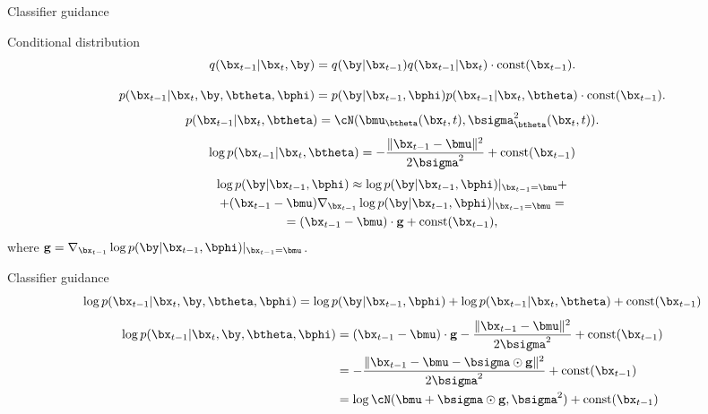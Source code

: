 \begin{frame}{Classifier guidance}
	\begin{block}{Conditional distribution}
		\[
			q(\bx_{t - 1} | \bx_t, \by) = q(\by | \bx_{t - 1}) q(\bx_{t - 1} | \bx_t) \cdot \text{const}(\bx_{t - 1}).
		\]
	\end{block}
	\vspace{-0.7cm}
	\[
		p(\bx_{t - 1} | \bx_t, \by, \btheta , \bphi) = p(\by | \bx_{t-1}, \bphi) p(\bx_{t-1} | \bx_t, \btheta) \cdot \text{const}(\bx_{t - 1}).
	\]
	\[
		p(\bx_{t-1} | \bx_t, \btheta) = \cN(\bmu_{\btheta}(\bx_t, t), \bsigma^2_{\btheta}(\bx_t, t)). 
	\]
	\[
		\log p(\bx_{t-1} | \bx_t, \btheta) = - \frac{\|\bx_{t - 1} - \bmu\|^2}{2 \bsigma^2} + \text{const}(\bx_{t-1})
	\]
	\begin{multline*}
		\log p(\by | \bx_{t-1}, \bphi) \approx \log p(\by | \bx_{t-1}, \bphi) |_{\bx_{t-1} = \bmu} + \\
		+ (\bx_{t-1} - \bmu) \nabla_{\bx_{t-1}} \log p(\by | \bx_{t-1}, \bphi) |_{\bx_{t-1} = \bmu} = \\
		= (\bx_{t-1} - \bmu) \cdot \mathbf{g} +  \text{const}(\bx_{t-1}),
	\end{multline*}
	where $\mathbf{g} =  \nabla_{\bx_{t-1}} \log p(\by | \bx_{t-1}, \bphi) |_{\bx_{t-1} = \bmu}$.
\end{frame}
\begin{frame}{Classifier guidance}
	\[
		\log p(\bx_{t - 1} | \bx_t, \by, \btheta , \bphi) = \log p(\by | \bx_{t-1}, \bphi) + \log p(\bx_{t-1} | \bx_t, \btheta) + \text{const}(\bx_{t - 1})
	\]
	\begin{align*}
		\log p(\bx_{t - 1} | \bx_t, \by, \btheta , \bphi) &= (\bx_{t-1} - \bmu) \cdot \mathbf{g} - \frac{\|\bx_{t - 1} - \bmu\|^2}{2 \bsigma^2} + \text{const}(\bx_{t-1}) \\
		& = - \frac{\|\bx_{t - 1} - \bmu - \bsigma \odot \mathbf{g}\|^2}{2 \bsigma^2} + \text{const}(\bx_{t-1}) \\
		& = \log \cN( \bmu + \bsigma \odot \mathbf{g}, \bsigma^2) + \text{const}(\bx_{t-1})
	\end{align*}
\end{frame}
